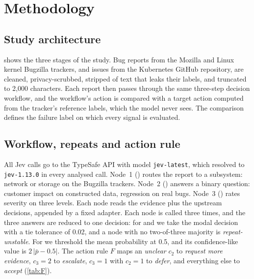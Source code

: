 \section{Methodology}
\label{sec:setting}

\begin{widefigure}
\centering
\resizebox{\linewidth}{!}{}
\caption{Study architecture. (1)~Bug and issue reports from three public
trackers are cleaned and stripped of label leaks. (2)~The evidence passes
through a dependent chain of three typed decisions, each called three
times and reduced by modal vote, with upstream decisions appended to the
evidence; an explicit action rule $F$ maps the second and third decisions
to an action. The same chain runs on Jev and on four comparison models.
(3)~Reference labels, never shown to the model, give the target action
$\astar$ through the same rule; a failure is $a \neq \astar$. Failure
signals are evaluated for ranking (RQ1, RQ2) and for review value under a
fixed budget and frozen costs (RQ3).}
\label{fig:arch}
\label{fig:workflow}
\end{widefigure}

\subsection{Study architecture}
 shows the three stages of the study. Bug reports from the
Mozilla and Linux kernel Bugzilla trackers, and issues from the
Kubernetes GitHub repository, are cleaned, privacy-scrubbed, stripped of
text that leaks their labels, and truncated to 2{,}000 characters. Each
report then passes through the same three-step decision workflow, and
the workflow's action is compared with a target action computed from the
tracker's reference labels, which the model never sees. The comparison
defines the failure label on which every signal is evaluated.

\subsection{Workflow, repeats and action rule}
All Jev calls go to the TypeSafe API with model \texttt{jev-latest}, which
resolved to \texttt{jev-1.13.0} in every analysed call. Node~1
(\choice{}) routes the report to a subsystem: network or storage on the
Bugzilla trackers. Node~2 (\noul{}) answers a binary question: customer
impact on constructed data, regression on real bugs. Node~3 (\score{})
rates severity on three levels. Each node reads the evidence plus the
upstream decisions, appended by a fixed adapter. Each node is called
three times, and the three answers are reduced to one decision: for
\choice{} and \score{} we take the modal decision with a tie tolerance of
0.02, and a node with no two-of-three majority is
\emph{repeat-unstable}. For \noul{} we threshold the mean probability at
0.5, and its confidence-like value is $2\,|\bar{p}-0.5|$. The action rule
$F$ maps an \emph{unclear} $c_2$ to \emph{request more evidence},
$c_3 = 2$ to \emph{escalate}, $c_3 = 1$ with $c_2 = 1$ to \emph{defer},
and everything else to \emph{accept} (\cref{tab:F}).

